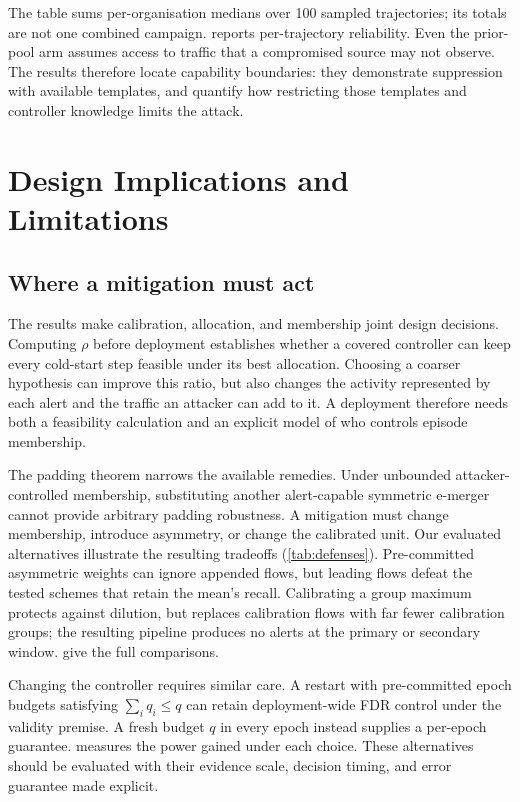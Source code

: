 \documentclass[conference]{IEEEtran}
\begin{document}
The table sums per-organisation medians over 100 sampled trajectories; its totals are not one
combined campaign.  reports per-trajectory reliability. Even the prior-pool
arm assumes access to traffic that a compromised source may not observe. The results therefore
locate capability boundaries: they demonstrate suppression with available templates, and quantify
how restricting those templates and controller knowledge limits the attack.

\section{Design Implications and Limitations}\label{sec:fixes}\label{sec:discussion}

\subsection{Where a mitigation must act}

The results make calibration, allocation, and membership joint design decisions. Computing $\rho$
before deployment establishes whether a covered controller can keep every cold-start step feasible
under its best allocation. Choosing a coarser hypothesis can improve this ratio, but also changes the
activity represented by each alert and the traffic an attacker can add to it. A deployment therefore
needs both a feasibility calculation and an explicit model of who controls episode membership.

The padding theorem narrows the available remedies. Under unbounded attacker-controlled membership,
substituting another alert-capable symmetric e-merger cannot provide arbitrary padding robustness.
A mitigation must change membership, introduce asymmetry, or change the calibrated unit.
Our evaluated alternatives illustrate the resulting tradeoffs (\cref{tab:defenses}).
Pre-committed asymmetric weights can ignore appended flows, but leading flows defeat the tested
schemes that retain the mean's recall. Calibrating a group maximum protects against dilution, but
replaces calibration flows with far fewer calibration groups; the resulting pipeline produces no
alerts at the primary or secondary window.  give the full comparisons.

Changing the controller requires similar care. A restart with pre-committed epoch budgets satisfying
$\sum_iq_i\le q$ can retain deployment-wide FDR control under the validity premise. A fresh budget
$q$ in every epoch instead supplies a per-epoch guarantee.  measures the
power gained under each choice. These alternatives should be evaluated with their evidence scale,
decision timing, and error guarantee made explicit.
\end{document}
